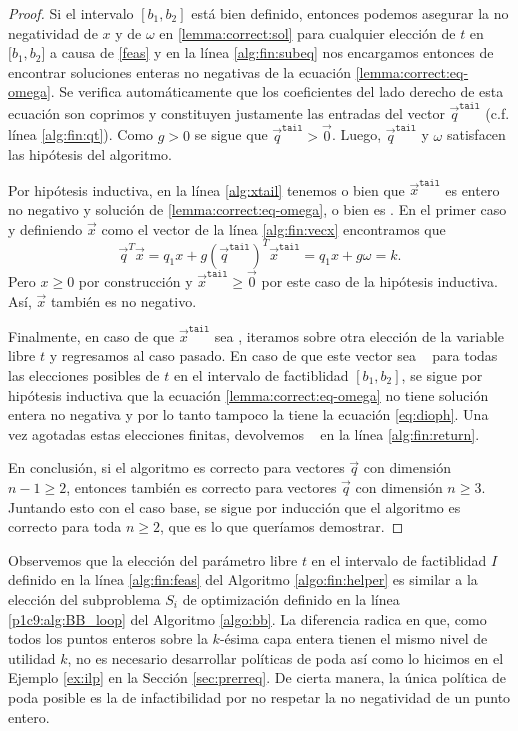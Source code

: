 \begin{proof}
	Si el intervalo $[b_1, b_2]$ está bien definido, entonces podemos asegurar la no negatividad de
	$x$ y de $\omega$ en \eqref{lemma:correct:sol} para cualquier elección de $t$ en $[b_1, b_2$] a
	causa de \eqref{feas} y en la línea \ref{alg:fin:subeq} nos encargamos entonces de encontrar
	soluciones enteras no negativas de la ecuación \eqref{lemma:correct:eq-omega}. Se verifica
	automáticamente que los coeficientes del lado derecho de esta ecuación son coprimos y
	constituyen justamente las entradas del vector $\vec{q}^{\texttt{tail}}$ (c.f. línea
	\ref{alg:fin:qt}). Como $g > 0$ se sigue que $\vec{q}^{\texttt{tail}} > \vec{0}$. Luego,
	$\vec{q}^{\texttt{tail}}$ y $\omega$ satisfacen las hipótesis del algoritmo.

	Por hipótesis inductiva, en la línea \ref{alg:xtail} tenemos o bien que
	$\vec{x}^{\texttt{tail}}$ es entero no negativo y solución de \eqref{lemma:correct:eq-omega}, o
	bien es \NIL. En el primer caso y definiendo $\vec{x}$ como el vector de la línea
	\ref{alg:fin:vecx} encontramos que
	\begin{equation*}
		\vec{q}^T\vec{x} = q_1x + g\left(\vec{q}^{\texttt{tail}}\right)^T\vec{x}^{\texttt{tail}}
		= q_1x + g\omega = k.
	\end{equation*}
	Pero $x \geq 0$ por construcción y $\vec{x}^{\texttt{tail}} \geq \vec{0}$ por este caso de la
	hipótesis inductiva. Así, $\vec{x}$ también es no negativo.

	Finalmente, en caso de que $\vec{x}^{\texttt{tail}}$ sea \NIL, iteramos sobre otra elección de
	la variable libre $t$ y regresamos al caso pasado. En caso de que este vector sea \NIL~ para
	todas las elecciones posibles de $t$ en el intervalo de factiblidad $[b_1, b_2]$, se sigue por
	hipótesis inductiva que la ecuación \eqref{lemma:correct:eq-omega} no tiene solución entera no
	negativa y por lo tanto tampoco la tiene la ecuación \eqref{eq:dioph}. Una vez agotadas estas
	elecciones finitas, devolvemos \NIL~ en la línea \ref{alg:fin:return}.

	En conclusión, si el algoritmo es correcto para vectores $\vec{q}$ con dimensión $n - 1 \geq 2$,
	entonces también es correcto para vectores $\vec{q}$ con dimensión $n \geq 3$. Juntando esto con el
	caso base, se sigue por inducción que el algoritmo es correcto para toda $n \geq 2$, que es lo
	que queríamos demostrar.
\end{proof}

Observemos que la elección del parámetro libre $t$ en el intervalo de factiblidad $I$ definido en la
línea \ref{alg:fin:feas} del Algoritmo \ref{algo:fin:helper} es similar a la elección del
subproblema $S_i$ de optimización definido en la línea \ref{p1c9:alg:BB_loop} del Algoritmo
\ref{algo:bb}. La diferencia radica en que, como todos los puntos enteros sobre la $k$-ésima capa
entera tienen el mismo nivel de utilidad $k$, no es necesario desarrollar políticas de poda así como
lo hicimos en el Ejemplo \ref{ex:ilp} en la Sección \ref{sec:prerreq}. De cierta manera, la única
política de poda posible es la de infactibilidad por no respetar la no negatividad de un punto
entero.

